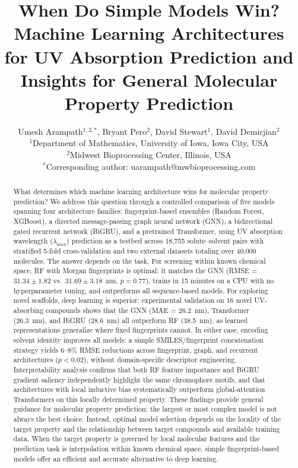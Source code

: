 \documentclass[11pt,a4paper]{article}
\title{When Do Simple Models Win? Machine Learning Architectures for UV Absorption Prediction and Insights for General Molecular Property Prediction}
\author{
    Umesh Arampath$^{1,2,*}$, Bryant Pero$^{2}$, David Stewart$^{1}$, David Demirjian$^{2}$ \\[0.5em]
    \small $^1$Department of Mathematics, University of Iowa, Iowa City, USA \\
    \small $^2$Midwest Bioprocessing Center, Illinois, USA \\[0.3em]
    \small $^*$Corresponding author: uarampath@mwbioprocessing.com
}
\date{}
\begin{document}
\maketitle

\begin{abstract}
What determines which machine learning architecture wins for molecular property prediction?
We address this question through a controlled comparison of five models spanning four architecture families: fingerprint-based ensembles (Random Forest, XGBoost), a directed message-passing graph neural network (GNN), a bidirectional gated recurrent network (BiGRU), and a pretrained Transformer, using UV absorption wavelength ($\lambda_{\max}$) prediction as a testbed across 18,755 solute--solvent pairs with stratified 5-fold cross-validation and two external datasets totaling over 40,000 molecules.
The answer depends on the task.
For screening within known chemical space, RF with Morgan fingerprints is optimal: it matches the GNN (RMSE = $31.34 \pm 1.82$ vs.\ $31.69 \pm 3.18$~nm, $p = 0.77$), trains in 15 minutes on a CPU with no hyperparameter tuning, and outperforms all sequence-based models.
For exploring novel scaffolds, deep learning is superior: experimental validation on 16 novel UV-absorbing compounds shows that the GNN (MAE = 26.2~nm), Transformer (26.3~nm), and BiGRU (28.6~nm) all outperform RF (38.5~nm), as learned representations generalize where fixed fingerprints cannot.
In either case, encoding solvent identity improves all models: a simple SMILES/fingerprint concatenation strategy yields 6--8\% RMSE reductions across fingerprint, graph, and recurrent architectures ($p < 0.02$), without domain-specific descriptor engineering.
Interpretability analysis confirms that both RF feature importance and BiGRU gradient saliency independently highlight the same chromophore motifs, and that architectures with local inductive bias systematically outperform global-attention Transformers on this locally determined property.
These findings provide general guidance for molecular property prediction: the largest or most complex model is not always the best choice. Instead, optimal model selection depends on the locality of the target property and the relationship between target compounds and available training data. When the target property is governed by local molecular features and the prediction task is interpolation within known chemical space, simple fingerprint-based models offer an efficient and accurate alternative to deep learning.
\end{abstract}
\end{document}
